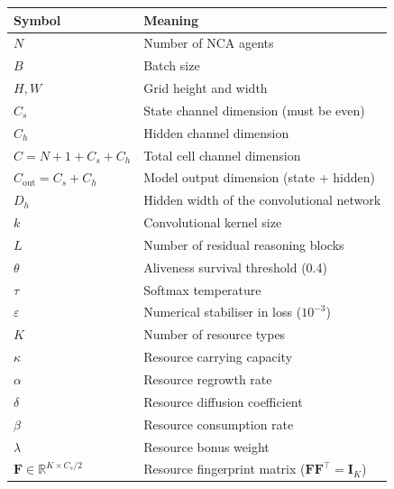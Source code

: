 \documentclass[11pt,a4paper]{article}
\newcommand{\R}{\mathbb{R}}
\newcommand{\F}{\mathbf{F}}
\theoremstyle{definition}
\begin{document}
\begin{center}
\begin{tabular}{lp{10cm}}
    \toprule
    Symbol & Meaning \\
    \midrule
    $N$ & Number of NCA agents \\
    $B$ & Batch size \\
    $H, W$ & Grid height and width \\
    $C_s$ & State channel dimension (must be even) \\
    $C_h$ & Hidden channel dimension \\
    $C = N+1+C_s+C_h$ & Total cell channel dimension \\
    $C_\mathrm{out} = C_s + C_h$ & Model output dimension (state + hidden) \\
    $D_h$ & Hidden width of the convolutional network \\
    $k$ & Convolutional kernel size \\
    $L$ & Number of residual reasoning blocks \\
    $\theta$ & Aliveness survival threshold (0.4) \\
    $\tau$ & Softmax temperature \\
    $\varepsilon$ & Numerical stabiliser in loss ($10^{-3}$) \\
    $K$ & Number of resource types \\
    $\kappa$ & Resource carrying capacity \\
    $\alpha$ & Resource regrowth rate \\
    $\delta$ & Resource diffusion coefficient \\
    $\beta$ & Resource consumption rate \\
    $\lambda$ & Resource bonus weight \\
    $\F \in \R^{K \times C_s/2}$ & Resource fingerprint matrix ($\F\F^\top = \mathbf{I}_K$) \\
    \bottomrule
\end{tabular}
\end{center}
\end{document}
